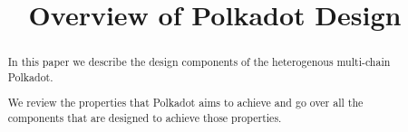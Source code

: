 \documentclass{article}
\title{Overview of Polkadot Design}
\author{}
\begin{document}
\maketitle

\begin{abstract}
In this paper we describe the design components of the heterogenous multi-chain Polkadot.

We review the properties that Polkadot aims to achieve and go over all the components that are designed to achieve those properties.

\end{abstract}









\end{document}
